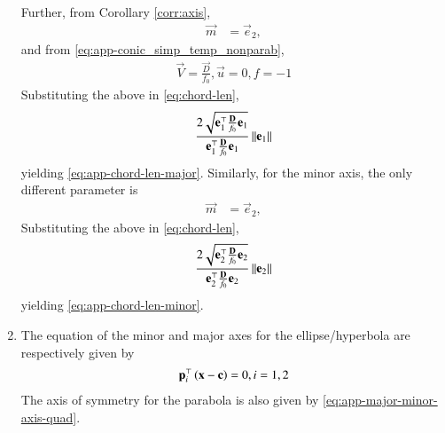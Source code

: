 \begin{enumerate}[label=\thesubsection.\arabic*.,ref=\thesubsection.\theenumi]
Further, from Corollary  
		\eqref{corr:axis},
  \begin{align}
  \vec{m}&= \vec{e}_2,  
\end{align} and
from 
    \eqref{eq:app-conic_simp_temp_nonparab},
  \begin{align}
	  \vec{V} =     \frac{\vec{D} }{f_0}, 
	   \vec{u} = 0, 
	   f = -1
	    \label{eq:latus_rectum_ellipse_param}
\end{align}  
Substituting the above in
\eqref{eq:chord-len}, 
\begin{align}
 \frac{2\sqrt{
\mathbf{e}_1^{\top}\frac{\mathbf{D}}{f_0}\mathbf{e}_1
}
}
{
\mathbf{e}_1^{\top}\frac{\mathbf{D}}{f_0}\mathbf{e}_1
}\left\lVert\mathbf{e}_1\right\rVert
  \end{align}
  yielding 
\eqref{eq:app-chord-len-major}.
Similarly, for the minor axis, the only different parameter is 
  \begin{align}
  \vec{m}&= \vec{e}_2,  
\end{align} 
Substituting the above in
\eqref{eq:chord-len}, 
\begin{align}
 \frac{2\sqrt{
\mathbf{e}_2^{\top}\frac{\mathbf{D}}{f_0}\mathbf{e}_2
}
}
{
\mathbf{e}_2^{\top}\frac{\mathbf{D}}{f_0}\mathbf{e}_2
}\left\lVert\mathbf{e}_2\right\rVert
  \end{align}
  yielding 
\eqref{eq:app-chord-len-minor}.
    \item The equation of the minor and major  axes for the ellipse/hyperbola are respectively given by 
  \begin{align}
\mathbf{p}_i^{\top}\left(\mathbf{x}-\mathbf{c}\right) = 0, i = 1,2
	  \label{eq:app-major-minor-axis-quad}
  \end{align}
  The axis of symmetry for the parabola is also given by 
	  \eqref{eq:app-major-minor-axis-quad}.


\end{enumerate}
